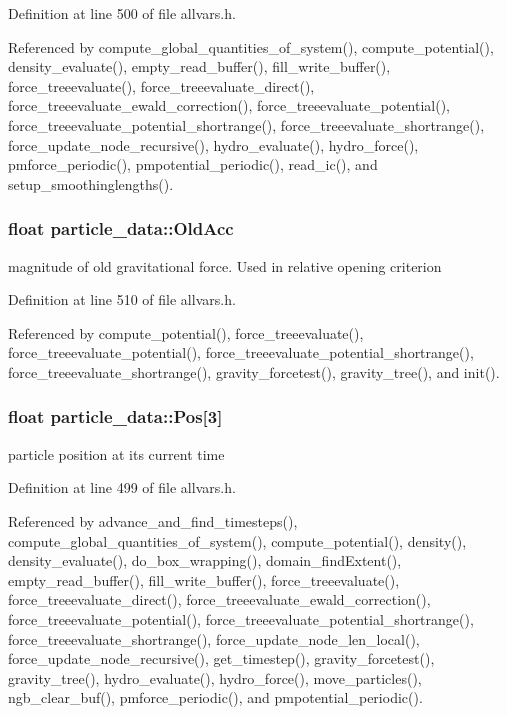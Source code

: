 Definition at line 500 of file allvars.h.



Referenced by compute\_\-global\_\-quantities\_\-of\_\-system(), compute\_\-potential(), density\_\-evaluate(), empty\_\-read\_\-buffer(), fill\_\-write\_\-buffer(), force\_\-treeevaluate(), force\_\-treeevaluate\_\-direct(), force\_\-treeevaluate\_\-ewald\_\-correction(), force\_\-treeevaluate\_\-potential(), force\_\-treeevaluate\_\-potential\_\-shortrange(), force\_\-treeevaluate\_\-shortrange(), force\_\-update\_\-node\_\-recursive(), hydro\_\-evaluate(), hydro\_\-force(), pmforce\_\-periodic(), pmpotential\_\-periodic(), read\_\-ic(), and setup\_\-smoothinglengths().

\hypertarget{structparticle__data_a5466aae28c06365368c9399c8f7cc02d}{
\subsubsection[{OldAcc}]{\setlength{\rightskip}{0pt plus 5cm}float {\bf particle\_\-data::OldAcc}}}
\label{structparticle__data_a5466aae28c06365368c9399c8f7cc02d}
magnitude of old gravitational force. Used in relative opening criterion 

Definition at line 510 of file allvars.h.



Referenced by compute\_\-potential(), force\_\-treeevaluate(), force\_\-treeevaluate\_\-potential(), force\_\-treeevaluate\_\-potential\_\-shortrange(), force\_\-treeevaluate\_\-shortrange(), gravity\_\-forcetest(), gravity\_\-tree(), and init().

\hypertarget{structparticle__data_a764ffe35d82a64065f585e3a84263dd1}{
\subsubsection[{Pos}]{\setlength{\rightskip}{0pt plus 5cm}float {\bf particle\_\-data::Pos}\mbox{[}3\mbox{]}}}
\label{structparticle__data_a764ffe35d82a64065f585e3a84263dd1}
particle position at its current time 

Definition at line 499 of file allvars.h.



Referenced by advance\_\-and\_\-find\_\-timesteps(), compute\_\-global\_\-quantities\_\-of\_\-system(), compute\_\-potential(), density(), density\_\-evaluate(), do\_\-box\_\-wrapping(), domain\_\-findExtent(), empty\_\-read\_\-buffer(), fill\_\-write\_\-buffer(), force\_\-treeevaluate(), force\_\-treeevaluate\_\-direct(), force\_\-treeevaluate\_\-ewald\_\-correction(), force\_\-treeevaluate\_\-potential(), force\_\-treeevaluate\_\-potential\_\-shortrange(), force\_\-treeevaluate\_\-shortrange(), force\_\-update\_\-node\_\-len\_\-local(), force\_\-update\_\-node\_\-recursive(), get\_\-timestep(), gravity\_\-forcetest(), gravity\_\-tree(), hydro\_\-evaluate(), hydro\_\-force(), move\_\-particles(), ngb\_\-clear\_\-buf(), pmforce\_\-periodic(), and pmpotential\_\-periodic().

